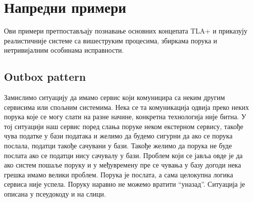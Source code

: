\section{Напредни примери}
Ови примери претпостављају познавање основних концепата TLA+ и приказују реалистичније системе
са вишеструким процесима, збиркама порука и нетривијалним особинама исправности.

\subsection{Outbox pattern}
Замислимо ситуацију да имамо сервис који комуницира са неким другим сервисима или спољним системима.
Нека се та комуникација одвија преко неких порука које се могу слати на разне начине, конкретна
технологија није битна. У тој ситуацији наш сервис поред слања поруке неком екстерном сервису, 
такође чува податке у бази података и желимо да будемо сигурни да ако се порука послала, податци такође
сачувани у бази. Такође желимо да порука не буде послата ако се податци нису сачувалу у бази.
 Проблем који се јавља овде је да ако систем пошаље поруку и у међувремену пре се чувања
у базу догоди нека грешка имамо велики проблем. Порука је послата, а сама целокупна логика сервиса није успела.
Поруку наравно не можемо вратити \enquote{уназад}. Ситуација је описана у псеудокоду и на слици.

